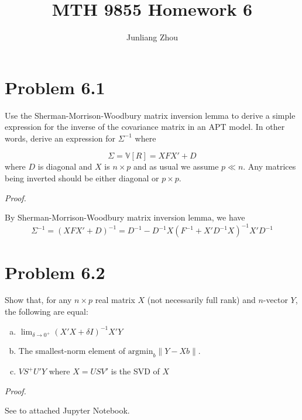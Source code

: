 \documentclass[a4paper]{article}
\title{MTH 9855 Homework 6}
\author{Junliang Zhou}
\begin{document}
\maketitle

\section{Problem 6.1}

Use the Sherman-Morrison-Woodbury matrix inversion lemma to derive a simple expression for the inverse of the covariance matrix in an APT model. In other words, derive an expression for $\Sigma^{-1}$ where

\[\Sigma=\mathbb{V}[R]=XFX'+D\]
where $D$ is diagonal and $X$ is $n\times p$ and as usual we assume $p\ll n$. Any matrices being inverted should be either diagonal or $p\times p$.\newline

\textit{Proof.}\newline

By Sherman-Morrison-Woodbury matrix inversion lemma, we have
\[\Sigma^{-1}={(XFX'+D)}^{-1}=D^{-1}-D^{-1} X {(F^{-1}+X' D^{-1} X)}^{-1} X' D^{-1}\]

\section{Problem 6.2}

Show that, for any $n\times p$ real matrix $X$ (not necessarily full rank) and $n$-vector $Y$, the following are equal:

\begin{enumerate}[(a)]
\item $\lim_{\delta \to 0^{+}} {(X'X+\delta I)}^{-1} X'Y$
\item The smallest-norm element of $\text{argmin}_b \lVert Y-Xb \rVert$.
\item $VS^{+}U'Y$ where $X=USV'$ is the SVD of $X$
\end{enumerate}

\textit{Proof.}\newline

See to attached Jupyter Notebook.\newline
\end{document}
